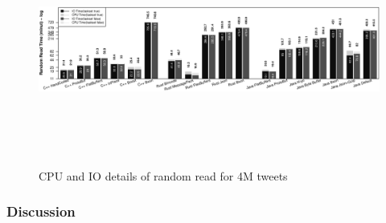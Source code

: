 \begin{figure}
	\centering
	\includegraphics[width=\linewidth,height=3in,keepaspectratio]{../../RScripts/Experiment_Rand_Read_CPU_IO_Bar.pdf}
	\caption{CPU and IO details of random read for 4M tweets}
	\label{fig:rand_read_detail}
\end{figure}

\subsubsection{Discussion}
